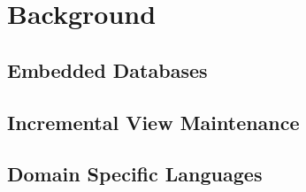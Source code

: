 \chapter{Background}
\section{Embedded Databases}
\section{Incremental View Maintenance}
\section{Domain Specific Languages}

